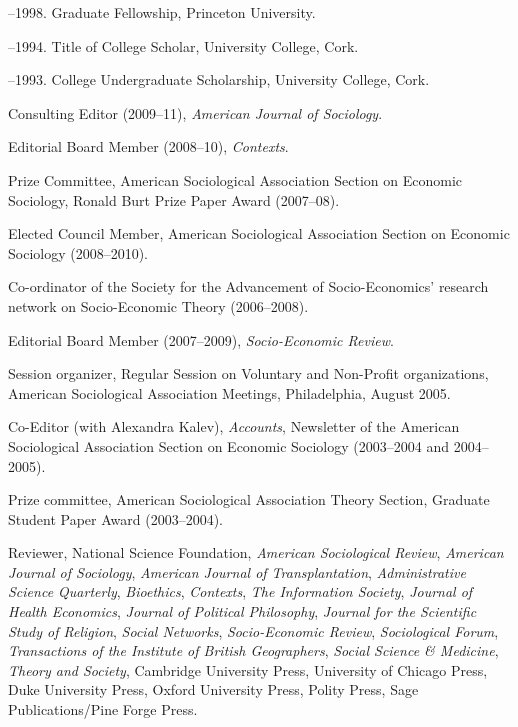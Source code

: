 \documentclass[11pt]{article}
\begin{document}
--1998. Graduate Fellowship, Princeton University.

--1994. Title of College Scholar, University College, Cork.

--1993. College Undergraduate Scholarship, University
College, Cork.


\bigskip 

\newpage

\medskip

\medskip

\ind Consulting Editor (2009--11), \emph{American Journal of Sociology}.

\ind Editorial Board Member (2008--10), \emph{Contexts}. 

\ind Prize Committee, American Sociological Association Section on Economic Sociology, Ronald Burt Prize Paper Award (2007--08).

\ind Elected Council Member, American Sociological Association Section on Economic
Sociology (2008--2010). 

\ind Co-ordinator of the Society for the Advancement of Socio-Economics' research network on Socio-Economic Theory (2006--2008). 

\ind Editorial Board Member (2007--2009), \emph{Socio-Economic Review}.

\ind Session organizer, Regular Session on Voluntary and Non-Profit organizations, American Sociological Association Meetings, Philadelphia, August 2005.

\ind Co-Editor (with Alexandra Kalev), \emph{Accounts}, Newsletter of the American Sociological Association Section on Economic Sociology (2003--2004 and 2004--2005).

\ind Prize committee, American Sociological Association Theory Section, Graduate Student Paper Award (2003--2004).

\ind Reviewer, National Science Foundation, \emph{American
  Sociological Review}, \emph{American Journal of Sociology},
\emph{American Journal of Transplantation}, \emph{Administrative
  Science Quarterly}, \emph{Bioethics}, \emph{Contexts}, \emph{The Information
  Society}, \emph{Journal of Health Economics}, \emph{Journal of Political Philosophy}, \emph{Journal for the Scientific Study of Religion}, \emph{Social Networks}, \emph{Socio-Economic Review}, \emph{Sociological Forum}, \emph{Transactions of the Institute of British Geographers}, \emph{Social Science \& Medicine}, \emph{Theory and Society}, Cambridge University Press, University of Chicago Press, Duke University Press, Oxford University Press, Polity Press, Sage Publications/Pine Forge Press.
\end{document}
